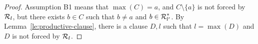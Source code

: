 \begin{proof}
%
Assumption B1 means that
 \(\max(C)=a\), and \(C\setminus\{a\}\) is not forced by \(\mbox {$\cal R$}_l\),
but there exists \(b\in C\) such that \(b\neq a\) and \(b\in \mbox {$\cal R$}_{l'}^\ast\).
By Lemma~\ref {le:productive-clause}, there is a clause $D,l$ such that
\(l=\max(D)\) and $D$ is not forced by \(\mbox {$\cal R$}_l\).

\end{proof}
